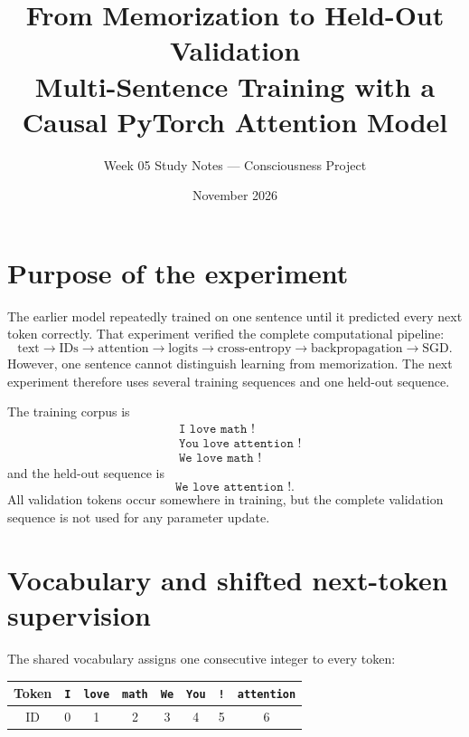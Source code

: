 \documentclass[11pt]{article}
\title{From Memorization to Held-Out Validation\\
\large Multi-Sentence Training with a Causal PyTorch Attention Model}
\author{Week 05 Study Notes --- Consciousness Project}
\date{November 2026}
\begin{document}
\maketitle

\begin{center}
\end{center}

\tableofcontents
\newpage

\section{Purpose of the experiment}

The earlier model repeatedly trained on one sentence until it predicted every next token correctly. That
experiment verified the complete computational pipeline:
\[
\text{text}\to\text{IDs}\to\text{attention}\to\text{logits}
\to\text{cross-entropy}\to\text{backpropagation}\to\text{SGD}.
\]
However, one sentence cannot distinguish learning from memorization. The next experiment therefore uses
several training sequences and one held-out sequence.

The training corpus is
\begin{align*}
&\texttt{I love math !}\\
&\texttt{You love attention !}\\
&\texttt{We love math !}
\end{align*}
and the held-out sequence is
\[
\texttt{We love attention !}.
\]
All validation tokens occur somewhere in training, but the complete validation sequence is not used for any
parameter update.

\section{Vocabulary and shifted next-token supervision}

The shared vocabulary assigns one consecutive integer to every token:
\begin{center}
\begin{tabular}{cccccccc}
\toprule
Token & \texttt{I} & \texttt{love} & \texttt{math} & \texttt{We} & \texttt{You} & \texttt{!} & \texttt{attention}\\
\midrule
ID & 0 & 1 & 2 & 3 & 4 & 5 & 6\\
\bottomrule
\end{tabular}
\end{center}
\end{document}
